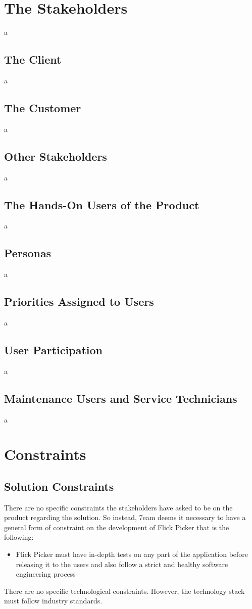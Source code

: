 \documentclass[12pt]{article}
\begin{document}
\section{The Stakeholders}
a

\subsection{The Client}
a

\subsection{The Customer}
a

\subsection{Other Stakeholders}
a

\subsection{The Hands-On Users of the Product}
a

\subsection{Personas}
a

\subsection{Priorities Assigned to Users}
a

\subsection{User Participation}
a

\subsection{Maintenance Users and Service Technicians}
a

\section{Constraints}

\subsection{Solution Constraints}
There are no specific constraints the stakeholders have asked to be on the product regarding the solution. So instead, 7eam deems it necessary to have a general form of constraint on the development of Flick Picker that is the following:
\begin{itemize}
	\item Flick Picker must have in-depth tests on any part of the application before releasing it to the users and also follow a strict and healthy software engineering process
\end{itemize}
There are no specific technological constraints. However, the technology stack must follow industry standards.
\end{document}
